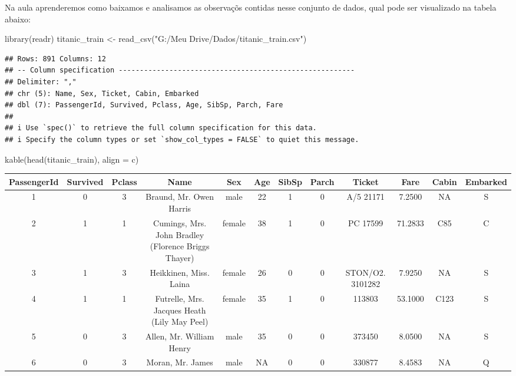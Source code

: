 \documentclass[
]{book}
\newenvironment{Shaded}{\begin{snugshade}}{\end{snugshade}}
\newcommand{\AttributeTok}[1]{\textcolor[rgb]{0.77,0.63,0.00}{#1}}
\newcommand{\FunctionTok}[1]{\textcolor[rgb]{0.00,0.00,0.00}{#1}}
\newcommand{\NormalTok}[1]{#1}
\newcommand{\OtherTok}[1]{\textcolor[rgb]{0.56,0.35,0.01}{#1}}
\newcommand{\StringTok}[1]{\textcolor[rgb]{0.31,0.60,0.02}{#1}}
\begin{document}
Na aula aprenderemos como baixamos e analisamos as observaçõs contidas nesse conjunto de dados, qual pode ser visualizado na tabela abaixo:

\begin{Shaded}
\begin{Highlighting}[]
\FunctionTok{library}\NormalTok{(readr)}
\NormalTok{titanic\_train }\OtherTok{\textless{}{-}} \FunctionTok{read\_csv}\NormalTok{(}\StringTok{"G:/Meu Drive/Dados/titanic\_train.csv"}\NormalTok{)}
\end{Highlighting}
\end{Shaded}

\begin{verbatim}
## Rows: 891 Columns: 12
## -- Column specification --------------------------------------------------------
## Delimiter: ","
## chr (5): Name, Sex, Ticket, Cabin, Embarked
## dbl (7): PassengerId, Survived, Pclass, Age, SibSp, Parch, Fare
## 
## i Use `spec()` to retrieve the full column specification for this data.
## i Specify the column types or set `show_col_types = FALSE` to quiet this message.
\end{verbatim}

\begin{Shaded}
\begin{Highlighting}[]
\FunctionTok{kable}\NormalTok{(}\FunctionTok{head}\NormalTok{(titanic\_train), }\AttributeTok{align =} \StringTok{\textquotesingle{}c\textquotesingle{}}\NormalTok{)}
\end{Highlighting}
\end{Shaded}

\begin{tabular}{c|c|c|c|c|c|c|c|c|c|c|c}
\hline
PassengerId & Survived & Pclass & Name & Sex & Age & SibSp & Parch & Ticket & Fare & Cabin & Embarked\\
\hline
1 & 0 & 3 & Braund, Mr. Owen Harris & male & 22 & 1 & 0 & A/5 21171 & 7.2500 & NA & S\\
\hline
2 & 1 & 1 & Cumings, Mrs. John Bradley (Florence Briggs Thayer) & female & 38 & 1 & 0 & PC 17599 & 71.2833 & C85 & C\\
\hline
3 & 1 & 3 & Heikkinen, Miss. Laina & female & 26 & 0 & 0 & STON/O2. 3101282 & 7.9250 & NA & S\\
\hline
4 & 1 & 1 & Futrelle, Mrs. Jacques Heath (Lily May Peel) & female & 35 & 1 & 0 & 113803 & 53.1000 & C123 & S\\
\hline
5 & 0 & 3 & Allen, Mr. William Henry & male & 35 & 0 & 0 & 373450 & 8.0500 & NA & S\\
\hline
6 & 0 & 3 & Moran, Mr. James & male & NA & 0 & 0 & 330877 & 8.4583 & NA & Q\\
\hline
\end{tabular}
\end{document}
